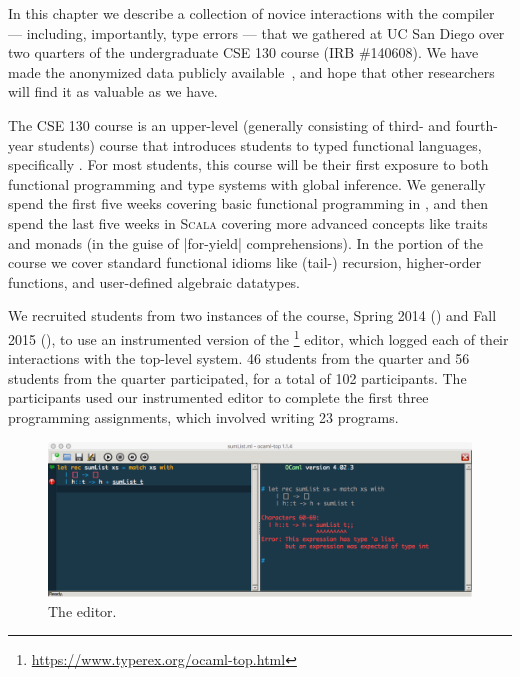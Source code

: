 In this chapter we describe a collection of novice interactions with the
\ocaml compiler --- including, importantly, type errors --- that we
gathered at UC San Diego over two quarters of the undergraduate CSE 130
course (IRB \#140608).
%
We have made the anonymized data publicly
available~\citep{Seidel2017-ko}, and hope that other researchers will
find it as valuable as we have.

The CSE 130 course is an upper-level (\ie generally consisting of third-
and fourth-year students) course that introduces students to typed
functional languages, specifically \ocaml.
%
For most students, this course will be their first exposure to both
functional programming and type systems with global inference.
%
We generally spend the first five weeks covering basic functional
programming in \ocaml, and then spend the last five weeks in
\textsc{Scala} covering more advanced concepts like traits and
monads (in the guise of |for-yield| comprehensions).
%
In the \ocaml portion of the course we cover standard functional idioms
like (tail-) recursion, higher-order functions, and user-defined
algebraic datatypes.

We recruited students from two instances of the course, Spring 2014
(\SPRING) and Fall 2015 (\FALL), to use an instrumented version of the
\ocamltop\footnote{\url{https://www.typerex.org/ocaml-top.html}} editor, which logged each of their
interactions with the \ocaml top-level system.
%
46 students from the \SPRING quarter and 56 students from the \FALL
quarter participated, for a total of 102 participants.
%
The participants used our instrumented editor to complete the first
three programming assignments, which involved writing 23 \ocaml
programs.
%

\begin{figure}[t]
\centering
\includegraphics[width=\linewidth]{ocaml-top.png}
\caption{The \ocamltop editor.}
\label{fig:intro:ocaml-top}
\end{figure}


